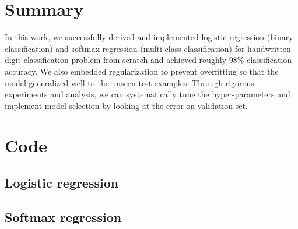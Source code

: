 \documentclass{article} %
\begin{document}
\section{Summary}
In this work, we successfully derived and implemented logistic regression (binary classification) and softmax regression (multi-class classification) for handwritten digit classification problem from scratch and achieved roughly $98\%$ classification accuracy. We also embedded regularization to prevent overfitting so that the model generalized well to the unseen test examples. Through rigorous experiments and analysis, we can systematically tune the hyper-parameters and implement model selection by looking at the error on validation set. 

\section{Code}
\subsection{Logistic regression}

\subsection{Softmax regression}
\end{document}
